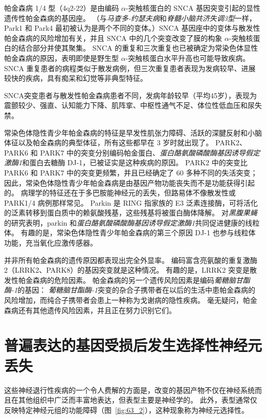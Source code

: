 帕金森病 1/4 型（4q2-22）是由编码 $\alpha$-突触核蛋白的 SNCA 基因突变引起的显性遗传性帕金森病的基因座。
（与\textit{马查多-约瑟夫病}和\textit{脊髓小脑共济失调3型}一样，Park1 和 Park4 最初被认为是两个不同的变体。）SNCA 基因座中的变体与散发性帕金森病的风险增加有关，并且 SNCA 中的几个突变改变了膜的构象 $\alpha$-突触核蛋白的结合部分并使其聚集。
SNCA 的重复和三次重复也已被确定为常染色体显性帕金森病的原因，表明即使是野生型 $\alpha$-突触核蛋白水平升高也可能导致疾病。
SNCA 重复患者的病程类似于散发病例，但三次重复患者表现为发病较早、进展较快的疾病，具有痴呆和幻觉等非典型特征。


SNCA突变患者与散发性帕金森病患者不同，发病年龄较早（平均45岁），表现为震颤较少、强直、认知能力下降、肌阵挛、中枢性通气不足、体位性低血压和尿失禁。


常染色体隐性青少年帕金森病的特征是早发性肌张力障碍、活跃的深腱反射和小脑体征以及帕金森病的典型体征，所有这些都早在 3 岁时就出现了。
PARK2、PARK6 和 PARK7 中的突变分别编码帕金蛋白、\textit{蛋白酪氨酸磷酸酶基因诱导假定激酶1}和蛋白去糖酶 DJ-1，已被证实是这种疾病的原因。
PARK2 中的突变比 PARK6 和 PARK7 中的突变更频繁，并且已经确定了 60 多种不同的失活突变；
因此，常染色体隐性青少年帕金森病是由基因产物功能丧失而不是功能获得引起的。
病理学的特征还在于多巴胺能神经元的丢失，但路易体不像散发性或 PARK1/4 病例那样常见。
Parkin 是 RING 指家族的 E3 泛素连接酶，可将活化的泛素转移到蛋白质中的赖氨酸残基，这些残基将被蛋白酶体降解。
对\textit{黑腹果蝇}的研究表明，parkin 和\textit{蛋白酪氨酸磷酸酶基因诱导假定激酶1}共同促进健康的线粒体。
有趣的是，常染色体隐性青少年帕金森病的第三个原因 DJ-1 也参与线粒体功能，充当氧化应激传感器。


并非所有帕金森病的遗传原因都表现出完全外显率。
编码富含亮氨酸的重复激酶 2（LRRK2、PARK8）的基因突变就是这种情况。
有趣的是，LRRK2 突变是散发性帕金森病的危险因素。
帕金森病的另一个遗传风险因素是编码\textit{葡糖脑甘酯酶-1}的基因：
\textit{葡糖脑甘酯酶-1}突变的杂合子携带者在以后的生活中患帕金森病的风险增加，而纯合子携带者会患上一种称为戈谢病的隐性疾病。
毫无疑问，帕金森病还有其他遗传风险因素，并且正在努力识别它们。



\section{普遍表达的基因受损后发生选择性神经元丢失}

这些神经退行性疾病的一个令人费解的方面是，改变的基因产物不仅在神经系统而且在其他组织中广泛而丰富地表达，但表型主要是神经学的。
此外，表型通常仅反映特定神经元组的功能障碍（图~\ref{fig:63_2}），这种现象称为神经元选择性。



